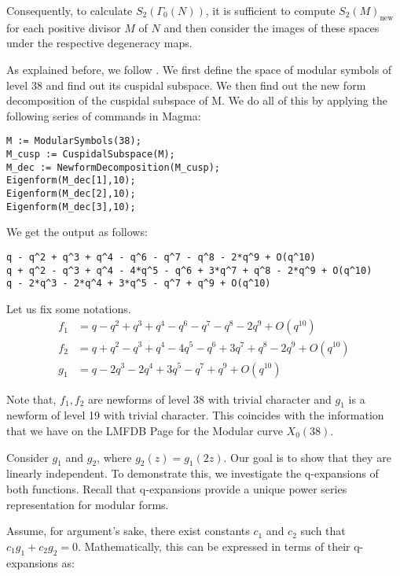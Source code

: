 Consequently, to calculate \( S_{2}(\Gamma_{0}(N)) \), it is sufficient to compute \( S_{2}(M)_{\text{new}} \) for each positive divisor \( M \) of \( N \) and then consider the images of these spaces under the respective degeneracy maps.

As explained before, we follow \cite{SteinModularForms2007}. We first define the space of modular symbols of level 38 and find out its cuspidal subspace. We then find out the new form decomposition of the cuspidal subspace of M. We do all of this by applying the following series of commands in Magma: 

\begin{verbatim}
M := ModularSymbols(38);
M_cusp := CuspidalSubspace(M);
M_dec := NewformDecomposition(M_cusp); 
Eigenform(M_dec[1],10);
Eigenform(M_dec[2],10);
Eigenform(M_dec[3],10);
\end{verbatim}

We get the output as follows: 

\begin{verbatim}
q - q^2 + q^3 + q^4 - q^6 - q^7 - q^8 - 2*q^9 + O(q^10)
q + q^2 - q^3 + q^4 - 4*q^5 - q^6 + 3*q^7 + q^8 - 2*q^9 + O(q^10)
q - 2*q^3 - 2*q^4 + 3*q^5 - q^7 + q^9 + O(q^10)
\end{verbatim}

Let us fix some notations. 
\begin{align}
f_1 &= q - q^2 + q^3 + q^4 - q^6 - q^7 - q^8 - 2q^9 + O(q^{10}) \\
f_2 &= q + q^2 - q^3 + q^4 - 4q^5 - q^6 + 3q^7 + q^8 - 2q^9 + O(q^{10}) \\
g_1 &= q - 2q^3 - 2q^4 + 3q^5 - q^7 + q^9 + O(q^{10})
\end{align}

Note that, $f_1, f_2$ are newforms of level 38 with trivial character and $g_1$ is a newform of level 19 with trivial character.  This coincides with the information that we have on the LMFDB Page for the Modular curve $X_0(38).$

Consider \( g_1 \) and \( g_2 \), where \( g_2(z) = g_1(2z) \). Our goal is to show that they are linearly independent. To demonstrate this, we investigate the q-expansions of both functions. Recall that q-expansions provide a unique power series representation for modular forms.

Assume, for argument's sake, there exist constants \( c_1 \) and \( c_2 \) such that \( c_1 g_1 + c_2 g_2 = 0 \). Mathematically, this can be expressed in terms of their q-expansions as:

